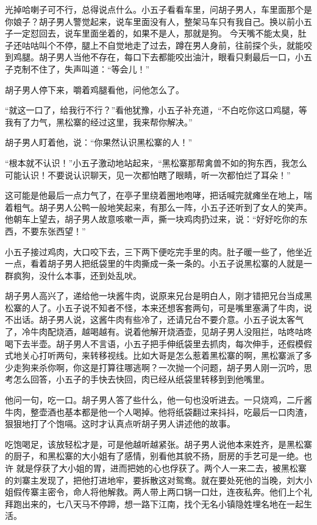 光掉哈喇子可不行，总得说点什么。小五子看看车里，问胡子男人，车里面那个是你娘子？胡子男人警觉起来，说车里面没有人，整架马车只有我自己。换以前小五子一定怼回去，说车里面坐着的，如果不是人，那就是狗。
今天嘴不能太臭，肚子还咕咕叫个不停，腿上不自觉地走了过去，蹲在男人身前，往前探个头，就能咬到鸡腿。胡子男人当他不存在，每口下去都能咬出油汁，眼看只剩最后一口，小五子克制不住了，失声叫道：“等会儿！”

胡子男人停下来，嚼着鸡腿看他，问他怎么了。

“就这一口了，给我行不行？”看他犹豫，小五子补充道，“不白吃你这口鸡腿，等我有了力气，黑松寨的经过这里，我来帮你解决。”

胡子男人盯着他，说：“你果然认识黑松寨的人！”

“根本就不认识！”小五子激动地站起来，“黑松寨那帮禽兽不如的狗东西，我怎么可能认识！不要说认识聊天，见一次都怕瞎了眼睛，听一次都怕烂了耳朵！”

这可能是他最后一点力气了，在亭子里绕着圈地咆哮，把话喊完就瘫坐在地上，喘着粗气。胡子男人公鸭一般地笑起来，有那么一阵，小五子还听到了女人的笑声。他朝车上望去，胡子男人故意咳嗽一声，撕一块鸡肉扔过来，说：“好好吃你的东西，不要东张西望！”

小五子接过鸡肉，大口咬下去，三下两下便吃完手里的肉。肚子暖一些了，他坐近一点，看着胡子男人把纸袋里的牛肉撕成一条一条的。小五子说黑松寨的人就是一群疯狗，没什么本事，还到处乱吠。

胡子男人高兴了，递给他一块酱牛肉，说原来兄台是明白人，刚才错把兄台当成黑松寨的人了。小五子说不知者不怪，本来还想客套两句，可是嘴里塞满了牛肉，说不出话。胡子男人说，这酱牛肉有些冷了，还请兄台不要介意。小五子说太客气了，冷牛肉配烧酒，越喝越有。说着他解开烧酒壶，见胡子男人没阻拦，咕咚咕咚喝下去半壶。胡子男人不言语，小五子把手伸纸袋里去抓肉，每次伸手，还假模假式地关心打听两句，来转移视线。比如大哥是怎么惹着黑松寨的啊，黑松寨派了多少走狗来杀你啊，你这是打算往哪逃啊？一次抛一个问题，胡子男人刚一沉吟，思考怎么回答，小五子的手快去快回，肉已经从纸袋里转移到到他嘴里。

他问一句，吃一口。胡子男人答了些什么，他一句也没听进去。一只烧鸡，二斤酱牛肉，整壶酒也基本都是他一个人喝掉。他将纸袋翻过来抖抖，吃最后一口肉渣，狠狠地打了个饱嗝。这时才认真点听胡子男人讲述他的故事。

吃饱喝足，该放轻松才是，可是他越听越紧张。胡子男人说他本来姓齐，是黑松寨的厨子，和黑松寨的大小姐有了感情，别看他其貌不扬，厨房的手艺可是一绝。也许
就是俘获了大小姐的胃，进而把她的心也俘获了。两个人一来二去，被黑松寨的刘寨主发现了，把他打进地牢，要拆散这对鸳鸯。就在要处死他的当晚，刘大小姐假传寨主密令，命人将他解救。两人带上两口锅一口灶，连夜私奔。他们上个礼拜跑出来的，七八天马不停蹄，想一路下江南，找个无名小镇隐姓埋名地在一起生活。

